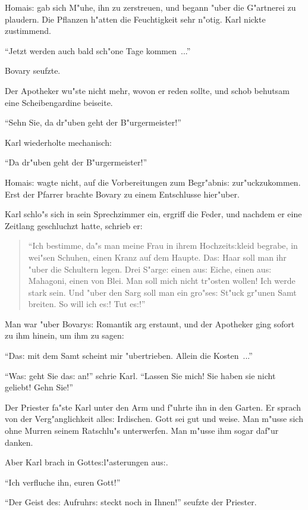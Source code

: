 \documentclass[oneside,12pt]{book}
\newcommand{\s}{s:}%
\begin{document}
Homai{\s} gab sich M"uhe, ihn zu zerstreuen, und begann "uber die
G"artnerei zu plaudern. Die Pflanzen h"atten die Feuchtigkeit sehr
n"otig. Karl nickte zustimmend.

"`Jetzt werden auch bald sch"one Tage kommen~..."'

Bovary seufzte.

Der Apotheker wu"ste nicht mehr, wovon er reden sollte, und schob
behutsam eine Scheibengardine beiseite.

"`Sehn Sie, da dr"uben geht der B"urgermeister!"'

Karl wiederholte mechanisch:

"`Da dr"uben geht der B"urgermeister!"'

Homai{\s} wagte nicht, auf die Vorbereitungen zum Begr"abni{\s}
zur"uckzukommen. Erst der Pfarrer brachte Bovary zu einem
Entschlusse hier"uber.

Karl schlo"s sich in sein Sprechzimmer ein, ergriff die Feder, und
nachdem er eine Zeitlang geschluchzt hatte, schrieb er:

\begin{quotation}
"`Ich bestimme, da"s man meine Frau in ihrem Hochzeit{\s}kleid
begrabe, in wei"sen Schuhen, einen Kranz auf dem Haupte. Da{\s}
Haar soll man ihr "uber die Schultern legen. Drei S"arge: einen
au{\s} Eiche, einen au{\s} Mahagoni, einen von Blei. Man soll mich
nicht tr"osten wollen! Ich werde stark sein. Und "uber den Sarg
soll man ein gro"se{\s} St"uck gr"unen Samt breiten. So will ich
e{\s}! Tut e{\s}!"'
\end{quotation}

Man war "uber Bovary{\s} Romantik arg erstaunt, und der Apotheker
ging sofort zu ihm hinein, um ihm zu sagen:

"`Da{\s} mit dem Samt scheint mir "ubertrieben. Allein die
Kosten~..."'

"`Wa{\s} geht Sie da{\s} an!"' schrie Karl. "`Lassen Sie mich! Sie
haben sie nicht geliebt! Gehn Sie!"'

Der Priester fa"ste Karl unter den Arm und f"uhrte ihn in den
Garten. Er sprach von der Verg"anglichkeit alle{\s} Irdischen.
Gott sei gut und weise. Man m"usse sich ohne Murren seinem
Ratschlu"s unterwerfen. Man m"usse ihm sogar daf"ur danken.

Aber Karl brach in Gotte{\s}l"asterungen au{\s}.

"`Ich verfluche ihn, euren Gott!"'

"`Der Geist de{\s} Aufruhr{\s} steckt noch in Ihnen!"' seufzte der
Priester.
\end{document}
